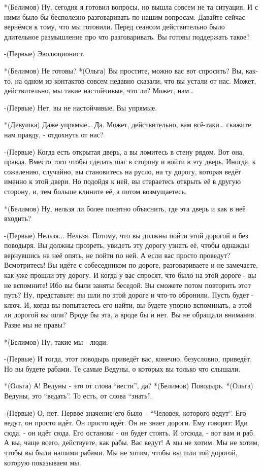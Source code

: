 *(Белимов) Ну, сегодня я готовил вопросы, но вышла совсем не та ситуация. И с ними было бы бесполезно разговаривать по нашим вопросам. Давайте сейчас вернёмся к тому, что мы готовили. Перед сеансом действительно было длительное размышление  про что разговаривать. Вы готовы поддержать такое?

-(Первые) Эволюционист.

*(Белимов) Не готовы?
*(Ольга) Вы простите, можно вас вот спросить? Вы, как-то, на одном из контактов совсем недавно сказали, что вы устали от нас. Может, действительно, мы такие настойчивые, что ли? Может, нам…

-(Первые) Нет, вы не настойчивые. Вы упрямые.

*(Девушка) Даже упрямые… Да. Может, действительно, вам всё-таки… скажите нам правду, - отдохнуть от нас?

-(Первые) Когда есть открытая дверь, а вы ломитесь в стену рядом. Вот она, правда. Вместо того чтобы сделать шаг в сторону и войти в эту дверь. Иногда, к сожалению, случайно, вы становитесь на русло,  на ту дорогу, которая ведёт именно к этой двери. Но подойдя к ней, вы стараетесь открыть её в другую сторону, и, тем больше клините её, а потом возмущаетесь.

*(Белимов) Ну, нельзя ли более понятно объяснить, где эта дверь и как в неё входить?

-(Первые) Нельзя... Нельзя. Потому, что вы должны пойти этой дорогой  и без поводыря. Вы должны прозреть, увидеть эту дорогу узнать её, чтобы однажды вернувшись на неё опять, не пойти по ней. А если вас просто проведут? Всмотритесь! Вы идёте с собеседником по дороге, разговариваете и не замечаете, как уже прошли эту дорогу. И когда у вас спросят, что было на этой дороге - вы не вспомните! Ибо вы были заняты беседой. Вы сможете потом повторить этот путь? Ну, представьте: вы шли по этой дороге и что-то обронили.  Пусть будет - ключ. И, когда вы попытаетесь его найти, вы будете упорно вспоминать, а этой ли дорогой вы шли? Вроде бы эта, а вроде бы и нет. Вы не обращали внимания. Разве мы не правы?

*(Белимов) Ну, такие мы - люди.

-(Первые) И тогда, этот поводырь  приведёт вас, конечно, безусловно, приведёт. Но вы будете рабами. Те самые Ведуны, о которых вы только что слышали.

*(Ольга) А! Ведуны - это от слова “вести”, да?
*(Белимов) Поводырь.
*(Ольга) Ведуны, это “ведать”. То есть, от слова “знать”.

-(Первые) О, нет. Первое значение его было – “Человек, которого ведут”. Его ведут, он  просто идёт. Он просто идёт. Он не знает дороги. Ему говорят: Иди сюда, - он идёт сюда. Его останови -  он будет стоять. И отсюда, - вот вам и раб. А вы, чаще всего, действуете, как рабы. Вас ведут! А мы не хотим. Мы не хотим, чтобы вы были нашими рабами. Мы не хотим, чтобы вы шли той дорогой, которую показываем мы.

